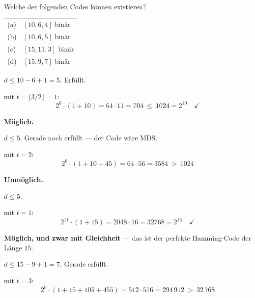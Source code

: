 \begin{aufgabe}
Welche der folgenden Codes können existieren?
\begin{center}
{\small
\renewcommand{\arraystretch}{1.4}
\begin{tabular}{@{}P{0.8cm}P{7.6cm}@{}}
\toprule
(a) & $[10,6,4]$ binär\\
(b) & $[10,6,5]$ binär\\
(c) & $[15,11,3]$ binär\\
(d) & $[15,9,7]$ binär\\
\bottomrule
\end{tabular}}
\end{center}

\loesung
{}
 $d \le 10-6+1 = 5$. Erfüllt. \checkmark

 mit $t = \lfloor3/2\rfloor = 1$:
\[ 2^{6}\cdot(1+10) = 64\cdot11 = 704 \ \le\ 1024 = 2^{10} \quad \checkmark \]

\textbf{Möglich.}

 $d \le 5$. Gerade noch erfüllt --- der Code wäre MDS.

 mit $t = 2$:
\[ 2^{6}\cdot(1+10+45) = 64\cdot56 = 3584 \ >\ 1024 \]

\textcolor{akzent}{\textbf{Unmöglich.}}

\begin{center}
\begin{minipage}{0.86\textwidth}
\end{minipage}
\end{center}

 $d \le 5$. \checkmark

 mit $t=1$:
\[ 2^{11}\cdot(1+15) = 2048\cdot16 = 32768 = 2^{15} \quad \checkmark \]

\textbf{Möglich, und zwar mit Gleichheit} --- das ist der perfekte Hamming-Code der Länge $15$.

 $d \le 15-9+1 = 7$. Gerade erfüllt.

 mit $t = 3$:
\[ 2^{9}\cdot(1+15+105+455) = 512\cdot576 = 294\,912 \ >\ 32\,768 \]


\end{aufgabe}
